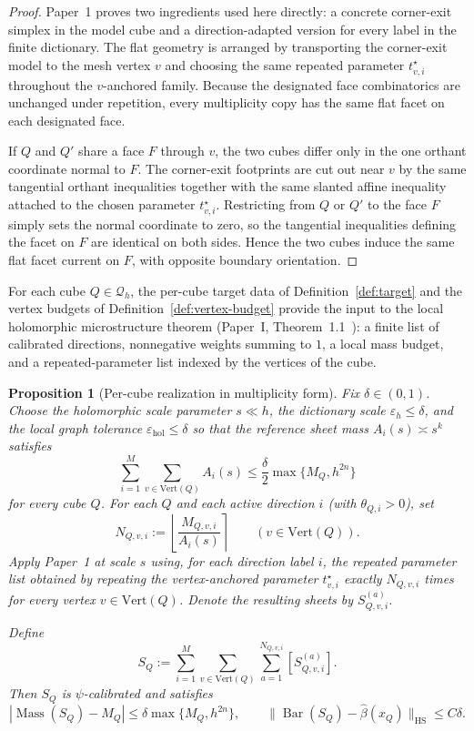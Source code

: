 \documentclass[11pt]{article}
\numberwithin{equation}{section}
\theoremstyle{plain}
\newtheorem{proposition}[theorem]{Proposition}
\theoremstyle{definition}
\theoremstyle{remark}
\DeclareMathOperator{\Mass}{Mass}
\DeclareMathOperator{\HS}{HS}
\newcommand{\eps}{\varepsilon}
\newcommand{\calQ}{\mathcal{Q}}
\newcommand{\Bary}{\operatorname{Bar}}
\begin{document}
\begin{proof}
Paper~1 proves two ingredients used here directly: a concrete corner-exit simplex in the model cube and a direction-adapted version for every label in the finite dictionary.  The flat geometry is arranged by transporting the corner-exit model to the mesh vertex $v$ and choosing the same repeated parameter $t_{v,i}^\star$ throughout the $v$-anchored family.  Because the designated face combinatorics are unchanged under repetition, every multiplicity copy has the same flat facet on each designated face.

If $Q$ and $Q'$ share a face $F$ through $v$, the two cubes differ only in the one orthant coordinate normal to $F$.  The corner-exit footprints are cut out near $v$ by the same tangential orthant inequalities together with the same slanted affine inequality attached to the chosen parameter $t_{v,i}^\star$.  Restricting from $Q$ or $Q'$ to the face $F$ simply sets the normal coordinate to zero, so the tangential inequalities defining the facet on $F$ are identical on both sides.  Hence the two cubes induce the same flat facet current on $F$, with opposite boundary orientation.
\end{proof}

For each cube $Q\in\calQ_h$, the per-cube target data of Definition~\ref{def:target} and the vertex budgets of Definition~\ref{def:vertex-budget} provide the input to the local holomorphic microstructure theorem (Paper~I, Theorem~1.1~\cite{Washburn26I}): a finite list of calibrated directions, nonneg\-ative weights summing to $1$, a local mass budget, and a repeated-parameter list indexed by the vertices of the cube.

\begin{proposition}[Per-cube realization in multiplicity form]\label{prop:per-cube}
Fix $\delta\in(0,1)$.  Choose the holomorphic scale parameter $s\ll h$, the dictionary scale $\eps_h\le \delta$, and the local graph tolerance $\eps_{\mathrm{hol}}\le \delta$ so that the reference sheet mass $A_i(s)\asymp s^k$ satisfies
\[
\sum_{i=1}^M\sum_{v\in\mathrm{Vert}(Q)} A_i(s)\le \frac{\delta}{2}\max\{M_Q,h^{2n}\}
\]
for every cube $Q$.  For each $Q$ and each active direction $i$ (with $\theta_{Q,i}>0$), set
\[
N_{Q,v,i}:=\left\lfloor\frac{M_{Q,v,i}}{A_i(s)}\right\rceil
\qquad
(v\in\mathrm{Vert}(Q)).
\]
Apply Paper~1 at scale $s$ using, for each direction label $i$, the repeated parameter list obtained by repeating the vertex-anchored parameter $t_{v,i}^\star$ exactly $N_{Q,v,i}$ times for every vertex $v\in\mathrm{Vert}(Q)$.  Denote the resulting sheets by $S_{Q,v,i}^{(a)}$.

Define
\[
S_Q:=\sum_{i=1}^M\sum_{v\in\mathrm{Vert}(Q)}\sum_{a=1}^{N_{Q,v,i}} [S_{Q,v,i}^{(a)}].
\]
Then $S_Q$ is $\psi$-calibrated and satisfies
\[
|\Mass(S_Q)-M_Q|\le \delta\max\{M_Q,h^{2n}\},
\qquad
\|\Bary(S_Q)-\widehat\beta(x_Q)\|_{\HS}\le C\delta.
\]
\end{proposition}
\end{document}
